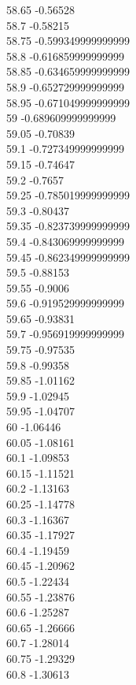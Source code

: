 {58.65	-0.56528\\
58.7	-0.58215\\
58.75	-0.599349999999999\\
58.8	-0.616859999999999\\
58.85	-0.634659999999999\\
58.9	-0.652729999999999\\
58.95	-0.671049999999999\\
59	-0.689609999999999\\
59.05	-0.70839\\
59.1	-0.727349999999999\\
59.15	-0.74647\\
59.2	-0.7657\\
59.25	-0.785019999999999\\
59.3	-0.80437\\
59.35	-0.823739999999999\\
59.4	-0.843069999999999\\
59.45	-0.862349999999999\\
59.5	-0.88153\\
59.55	-0.9006\\
59.6	-0.919529999999999\\
59.65	-0.93831\\
59.7	-0.956919999999999\\
59.75	-0.97535\\
59.8	-0.99358\\
59.85	-1.01162\\
59.9	-1.02945\\
59.95	-1.04707\\
60	-1.06446\\
60.05	-1.08161\\
60.1	-1.09853\\
60.15	-1.11521\\
60.2	-1.13163\\
60.25	-1.14778\\
60.3	-1.16367\\
60.35	-1.17927\\
60.4	-1.19459\\
60.45	-1.20962\\
60.5	-1.22434\\
60.55	-1.23876\\
60.6	-1.25287\\
60.65	-1.26666\\
60.7	-1.28014\\
60.75	-1.29329\\
60.8	-1.30613\\
}
